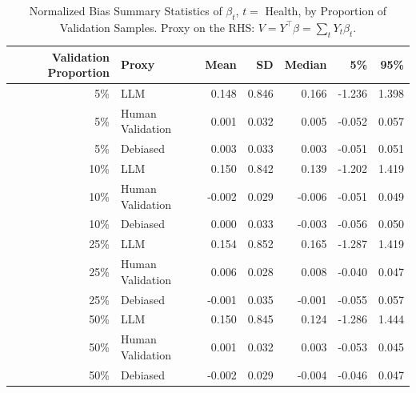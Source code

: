 \begin{table}

\caption{\label{tab:unnamed-chunk-1}Normalized Bias Summary Statistics of $\beta_{t}$, $t=$ Health, by Proportion of Validation Samples.
      Proxy on the RHS: $V = Y^\top \beta = \sum_{t} Y_t \beta_t$.}
\centering
\begin{tabular}[t]{rlrrrrr}
\toprule
Validation Proportion & Proxy & Mean & SD & Median & 5\% & 95\%\\
\midrule
5\% & LLM & 0.148 & 0.846 & 0.166 & -1.236 & 1.398\\
5\% & Human Validation & 0.001 & 0.032 & 0.005 & -0.052 & 0.057\\
5\% & Debiased & 0.003 & 0.033 & 0.003 & -0.051 & 0.051\\
10\% & LLM & 0.150 & 0.842 & 0.139 & -1.202 & 1.419\\
10\% & Human Validation & -0.002 & 0.029 & -0.006 & -0.051 & 0.049\\
10\% & Debiased & 0.000 & 0.033 & -0.003 & -0.056 & 0.050\\
25\% & LLM & 0.154 & 0.852 & 0.165 & -1.287 & 1.419\\
25\% & Human Validation & 0.006 & 0.028 & 0.008 & -0.040 & 0.047\\
25\% & Debiased & -0.001 & 0.035 & -0.001 & -0.055 & 0.057\\
50\% & LLM & 0.150 & 0.845 & 0.124 & -1.286 & 1.444\\
50\% & Human Validation & 0.001 & 0.032 & 0.003 & -0.053 & 0.045\\
50\% & Debiased & -0.002 & 0.029 & -0.004 & -0.046 & 0.047\\
\bottomrule
\end{tabular}
\end{table}
